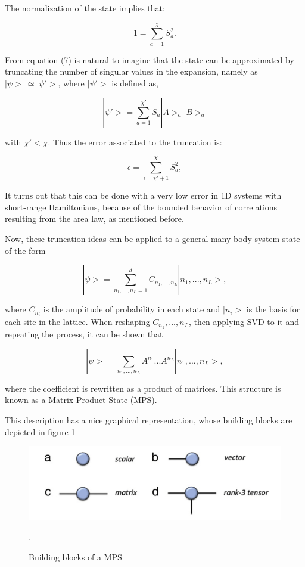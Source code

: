 \documentclass{article}
\begin{document}
The normalization of the state implies that:

\begin{equation}
    1=\sum^{\chi}_{a=1}S_a^2.
\end{equation}

From equation (7) is natural to imagine that the state can be approximated by truncating the number of singular values in the expansion, namely as $|\psi>\ \simeq |\psi'>$, where $|\psi'>$ is defined as,

\begin{equation}
    |\psi'>=\sum^{\chi'}_{a=1} S_a|A>_a|B>_a
\end{equation}

with $\chi'<\chi$. Thus the error associated to the truncation is:

\begin{equation}
  \epsilon=\sum^{\chi}_{i=\chi'+1}S_a^2,
\end{equation}

It turns out that this can be done with a very low error in 1D systems with short-range Hamiltonians, because of the bounded behavior of correlations resulting from the area law, as mentioned before.

Now, these truncation ideas can be applied to a general many-body system state of the form

\begin{equation}
    |\psi>=\sum^{d}_{n_1,...,n_L=1}C_{n_1,...,n_L}|n_1,...,n_L>,
\end{equation}

where $C_{n_i}$ is the amplitude of probability in each state and $|n_i>$ is the basis for each site in the lattice. When reshaping $C_{n_1},...,{n_L}$, then applying SVD to it and repeating the process, it can be shown that~\cite{ORUS2014117}  

\begin{equation}
    |\psi>=\sum_{n_1,...,n_L} A^{n_1}...A^{n_L}|n_1,...,n_L>,
\end{equation}

where the coefficient is rewritten as a product of matrices. This structure is known as a Matrix Product State (MPS).

This description has a nice graphical representation, whose building blocks are depicted in figure \ref{Tensor}

\begin{figure}
    \centering
    \includegraphics[scale=0.7]{TensorMPS.PNG}
    \caption{Building blocks of a MPS\cite{ORUS2014117}}.
    \label{Tensor}
\end{figure}
\end{document}
